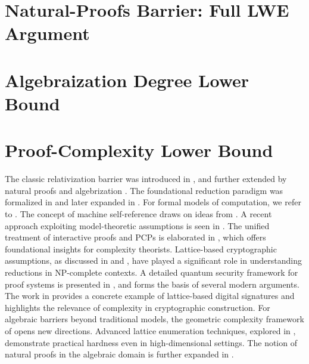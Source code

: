 \documentclass[12pt]{article}
\theoremstyle{definition}
\theoremstyle{plain}
\theoremstyle{remark}
\begin{document}
\section{Natural-Proofs Barrier: Full LWE Argument}\label{app:natural}


\section{Algebraization Degree Lower Bound}\label{app:algebra}


\section{Proof-Complexity Lower Bound}\label{app:proof}




The classic relativization barrier was introduced in \cite{BGS75}, and further extended by natural proofs \cite{RR97} and algebrization \cite{AW09}.
The foundational reduction paradigm was formalized in \cite{Cook71} and later expanded in \cite{Karp72}.
For formal models of computation, we refer to \cite{SipserBook}.
The concept of machine self-reference draws on ideas from \cite{Schmidhuber07}.
A recent approach exploiting model-theoretic assumptions is seen in \cite{Krajicek2025}.
The unified treatment of interactive proofs and PCPs is elaborated in \cite{AroraBarak}, which offers foundational insights for complexity theorists. 
Lattice-based cryptographic assumptions, as discussed in \cite{Regev05} and \cite{Regev09}, have played a significant role in understanding reductions in NP-complete contexts.
A detailed quantum security framework for proof systems is presented in \cite{Unruh2015}, and forms the basis of several modern arguments.
The work in \cite{Dilithium2022} provides a concrete example of lattice-based digital signatures and highlights the relevance of complexity in cryptographic construction.
For algebraic barriers beyond traditional models, the geometric complexity framework of \cite{MulmuleySohoni} opens new directions.
Advanced lattice enumeration techniques, explored in \cite{Albrecht17}, demonstrate practical hardness even in high-dimensional settings.
The notion of natural proofs in the algebraic domain is further expanded in \cite{AB09}.
\end{document}

